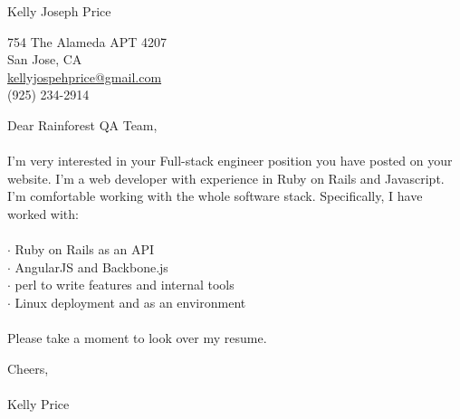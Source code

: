 \documentclass{article}
\begin{document}
\huge{Kelly Joseph Price}
\normalsize

\hspace{.5cm}

754 The Alameda APT 4207 \\
San Jose, CA \\
\href{mailto:kellyjosephprice@gmail.com}{kellyjospehprice@gmail.com} \\
(925) 234-2914 \\

\vspace{6cm}

Dear Rainforest QA Team,
\\\\
I'm very interested in your Full-stack engineer position you have
posted on your website. I'm a web developer with experience in Ruby on
Rails and Javascript. I'm comfortable working with the whole software
stack. Specifically, I have worked with: \\
\\
$\cdot$ Ruby on Rails as an API \\
$\cdot$ AngularJS and Backbone.js \\
$\cdot$ perl to write features and internal tools \\
$\cdot$ Linux deployment and as an environment \\
\\
Please take a moment to look over my resume.

\vspace{1cm}

Cheers,
\\\\
Kelly Price
\end{document}
